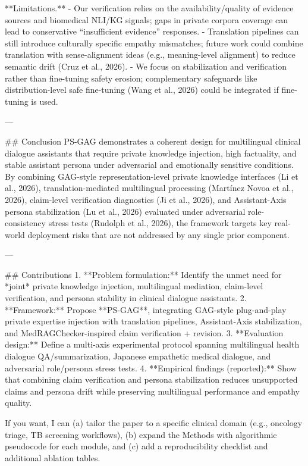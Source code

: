 **Limitations.**  
- Our verification relies on the availability/quality of evidence sources and biomedical NLI/KG signals; gaps in private corpora coverage can lead to conservative “insufficient evidence” responses.  
- Translation pipelines can still introduce culturally specific empathy mismatches; future work could combine translation with sense-alignment ideas (e.g., meaning-level alignment) to reduce semantic drift (Cruz et al., 2026).  
- We focus on stabilization and verification rather than fine-tuning safety erosion; complementary safeguards like distribution-level safe fine-tuning (Wang et al., 2026) could be integrated if fine-tuning is used.

---

## Conclusion  
PS-GAG demonstrates a coherent design for multilingual clinical dialogue assistants that require private knowledge injection, high factuality, and stable assistant persona under adversarial and emotionally sensitive conditions. By combining GAG-style representation-level private knowledge interfaces (Li et al., 2026), translation-mediated multilingual processing (Martínez Novoa et al., 2026), claim-level verification diagnostics (Ji et al., 2026), and Assistant-Axis persona stabilization (Lu et al., 2026) evaluated under adversarial role-consistency stress tests (Rudolph et al., 2026), the framework targets key real-world deployment risks that are not addressed by any single prior component.

---

## Contributions  
1. **Problem formulation:** Identify the unmet need for *joint* private knowledge injection, multilingual mediation, claim-level verification, and persona stability in clinical dialogue assistants.  
2. **Framework:** Propose **PS-GAG**, integrating GAG-style plug-and-play private expertise injection with translation pipelines, Assistant-Axis stabilization, and MedRAGChecker-inspired claim verification + revision.  
3. **Evaluation design:** Define a multi-axis experimental protocol spanning multilingual health dialogue QA/summarization, Japanese empathetic medical dialogue, and adversarial role/persona stress tests.  
4. **Empirical findings (reported):** Show that combining claim verification and persona stabilization reduces unsupported claims and persona drift while preserving multilingual performance and empathy quality.

If you want, I can (a) tailor the paper to a specific clinical domain (e.g., oncology triage, TB screening workflows), (b) expand the Methods with algorithmic pseudocode for each module, and (c) add a reproducibility checklist and additional ablation tables.